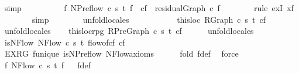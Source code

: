 \begin{isabellebody}
\ simp\ \ \ \ \isanewline
\isanewline
\ \ \ \ \isamarkupfalse%
\ {\isachardoublequoteopen}{\isasymexists}f{\isachardot}\ NPreflow\ c\ s\ t\ f\ {\isasymand}\ cf\ {\isacharequal}\ residualGraph\ c\ f{\isachardoublequoteclose}\isanewline
\ \ \ \ \ \ \isamarkupfalse%
\ {\isacharparenleft}rule\ exI{\isacharbrackleft}\ x{\isacharequal}{\isachardoublequoteopen}f{\isachardoublequoteclose}{\isacharbrackright}{\isacharparenright}\isanewline
\ \ \ \ \ \ \isamarkupfalse%
\ simp\isanewline
\ \ \ \ \ \ \isamarkupfalse%
\ unfold{\isacharunderscore}locales\ \ \isanewline
\ \ \isamarkupfalse%
%
\endisatagproof
{\isafoldproof}%
%
\isadelimproof
\ \ \isanewline
%
\endisadelimproof
\isanewline
\ \ \isamarkupfalse%
\ this{\isacharunderscore}loc{\isacharcolon}\ {\isachardoublequoteopen}RGraph\ c\ s\ t\ cf{\isachardoublequoteclose}\isanewline
%
\isadelimproof
\ \ \ \ %
\endisadelimproof
%
\isatagproof
{}\isamarkupfalse%
\ unfold{\isacharunderscore}locales%
\endisatagproof
{\isafoldproof}%
%
\isadelimproof
\isanewline
%
\endisadelimproof
\ \ \isamarkupfalse%
\ this{\isacharunderscore}loc{\isacharunderscore}rpg{\isacharcolon}\ {\isachardoublequoteopen}RPreGraph\ c\ s\ t\ cf{\isachardoublequoteclose}\isanewline
%
\isadelimproof
\ \ \ \ %
\endisadelimproof
%
\isatagproof
{}\isamarkupfalse%
\ unfold{\isacharunderscore}locales%
\endisatagproof
{\isafoldproof}%
%
\isadelimproof
\isanewline
%
\endisadelimproof
\ \ \ \ \isanewline
\ \ \isamarkupfalse%
\ is{\isacharunderscore}NFlow{\isacharcolon}\ {\isachardoublequoteopen}NFlow\ c\ s\ t\ {\isacharparenleft}flow{\isacharunderscore}of{\isacharunderscore}cf\ cf{\isacharparenright}{\isachardoublequoteclose}\isanewline
%
\isadelimproof
\ \ \ \ %
\endisadelimproof
%
\isatagproof
{}\isamarkupfalse%
\ EX{\isacharunderscore}RG\ f{\isacharunderscore}unique\ is{\isacharunderscore}NPreflow\ NFlow{\isachardot}axioms{\isacharparenleft}{}{\isacharparenright}\isanewline
\ \ \ \ \isamarkupfalse%
\ {\isacharparenleft}fold\ f{\isacharunderscore}def{\isacharparenright}\ \isamarkupfalse%
\ force%
\endisatagproof
{\isafoldproof}%
%
\isadelimproof
\ \ \isanewline
%
\endisadelimproof
\ \ \ \ \isanewline
\ \ \isamarkupfalse%
\ f{\isacharcolon}\ NFlow\ c\ s\ t\ f%
\isadelimproof
\ %
\endisadelimproof
%
\isatagproof
{}\isamarkupfalse%
\ f{\isacharunderscore}def\ \isamarkupfalse%

\end{isabellebody}
